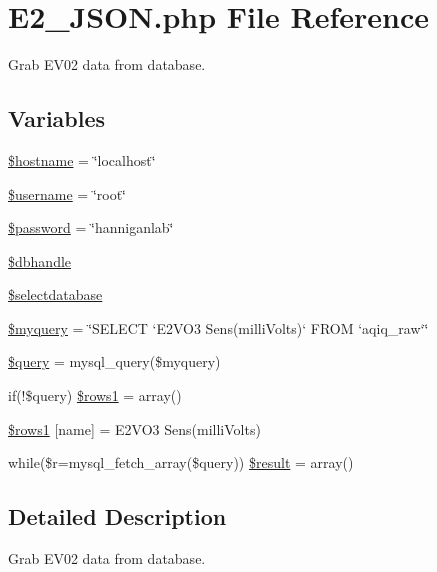 \hypertarget{_e2___j_s_o_n_8php}{}\section{E2\+\_\+\+J\+S\+O\+N.\+php File Reference}
\label{_e2___j_s_o_n_8php}


Grab E\+V02 data from database.  


\subsection*{Variables}
\begin{DoxyCompactItemize}
\item 
\hyperlink{_e2___j_s_o_n_8php_a8bf9ffb42ed554b203b55377d1fc9aa4}{\$hostname} = \char`\"{}localhost\char`\"{}
\item 
\hyperlink{_e2___j_s_o_n_8php_a0eb82aa5f81cf845de4b36cd653c42cf}{\$username} = \char`\"{}root\char`\"{}
\item 
\hyperlink{_e2___j_s_o_n_8php_a607686ef9f99ea7c42f4f3dd3dbb2b0d}{\$password} = \char`\"{}hanniganlab\char`\"{}
\item 
\hyperlink{_e2___j_s_o_n_8php_a013f690a9cf598d1498e72aa8aa8a8d2}{\$dbhandle}
\item 
\hyperlink{_e2___j_s_o_n_8php_a3a00cb9dd022e8ab0cdfe17aad984a14}{\$selectdatabase}
\item 
\hyperlink{_e2___j_s_o_n_8php_a8ff37acfddb2efb7962bb94d1c6d0d1c}{\$myquery} = \char`\"{}S\+E\+L\+E\+CT `E2\+V\+O3 Sens(milli\+Volts)` F\+R\+OM `aqiq\+\_\+raw`\char`\"{}
\item 
\hyperlink{_e2___j_s_o_n_8php_af59a5f7cd609e592c41dc3643efd3c98}{\$query} = mysql\+\_\+query(\$myquery)
\item 
if(!\$query) \hyperlink{_e2___j_s_o_n_8php_a15da33e0f4006a60bff01708cb5d1428}{\$rows1} = array()
\item 
\hyperlink{_e2___j_s_o_n_8php_aece741d5099bb229e07df7a57776cfaa}{\$rows1} \mbox{[}\textquotesingle{}name\textquotesingle{}\mbox{]} = \textquotesingle{}E2\+V\+O3 Sens(milli\+Volts)\textquotesingle{}
\item 
while(\$r=mysql\+\_\+fetch\+\_\+array(\$query)) \hyperlink{_e2___j_s_o_n_8php_a9148136d1e11f768be4f805d7e567da2}{\$result} = array()
\end{DoxyCompactItemize}


\subsection{Detailed Description}
Grab E\+V02 data from database. 


